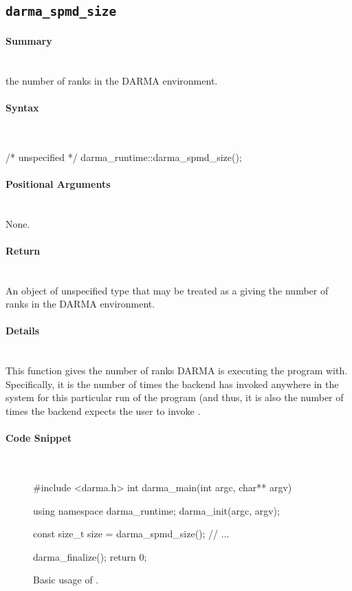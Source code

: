 \subsection{\texttt{darma\_spmd\_size}}


\paragraph{Summary}\mbox{}\\
 the number of \glspl{rank} in the DARMA environment.

\paragraph{Syntax}\mbox{}\\
\begin{CppCode}
/* unspecified */ darma_runtime::darma_spmd_size();
\end{CppCode}

\paragraph{Positional Arguments} \mbox{}\\
None. 

\paragraph{Return} \mbox{}\\
An object of unspecified type that may be treated as a 
giving the number of \glspl{rank} in the DARMA environment.

\paragraph{Details} \mbox{}\\
This function gives the number of \glspl{rank} DARMA is executing the program with. 
Specifically, it is the number of times the backend has invoked
 anywhere in the system for this particular run of the
program (and thus, it is also the number of times the backend expects the user
to invoke .

\paragraph{Code Snippet} \mbox{}\\
\begin{figure}[!h]
\begin{CppCodeNumb}
#include <darma.h>
int darma_main(int argc, char** argv)
{
  using namespace darma_runtime;
  darma_init(argc, argv);

  const size_t size = darma_spmd_size();
  // ...

  darma_finalize();
  return 0;
}
\end{CppCodeNumb}
\label{fig:fe_api_ranksize}
  \caption{Basic usage of \protect{}.}
\end{figure}

